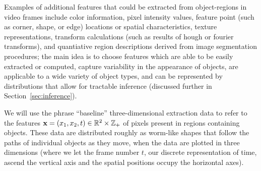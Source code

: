 \documentclass[smallcondensed, final]{svjour3}
\begin{document}
Examples of additional features that could be extracted from object-regions in video frames include color information, pixel intensity values, feature point (such as corner, shape, or edge) locations or spatial characteristics, texture representations, transform calculations (such as results of hough or fourier transforms), and quantiative region descriptions derived from image segmentation procedures; the main idea is to choose features which are able to be easily extracted or computed, capture variability in the appearance of objects, are applicable to a wide variety of object types, and can be represented by distributions that allow for tractable inference (discussed further in Section~\ref{sec:inference}).

We will use the phrase ``baseline'' three-dimensional extraction data to refer to the features $\bold{x} = ( x_{1}, x_{2}, t ) \in \mathbb{R}^{2} \times \mathbb{Z}_{+}$ of pixels present in regions containing objects. These data are distributed roughly as worm-like shapes that follow the paths of individual objects as they move, when the data are plotted in three dimensions (where we let the frame number $t$, our discrete representation of time, ascend the vertical axis and the spatial positions occupy the horizontal axes). 





\end{document}

